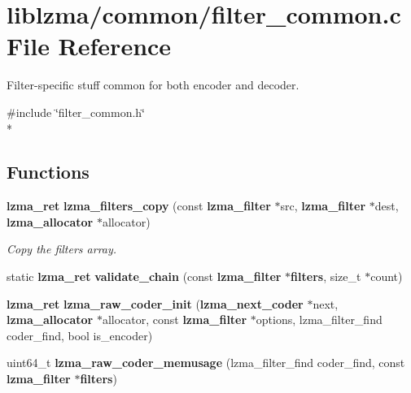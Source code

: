 \section{liblzma/common/filter\-\_\-common.c File Reference}
\label{filter__common_8c}


Filter-\/specific stuff common for both encoder and decoder.  


{\ttfamily \#include \char`\"{}filter\-\_\-common.\-h\char`\"{}}\\*
\subsection*{Functions}
\begin{DoxyCompactItemize}
\item 
{\bf lzma\-\_\-ret} {\bf lzma\-\_\-filters\-\_\-copy} (const {\bf lzma\-\_\-filter} $\ast$src, {\bf lzma\-\_\-filter} $\ast$dest, {\bf lzma\-\_\-allocator} $\ast$allocator)
\begin{DoxyCompactList}\small\item\em Copy the filters array. \end{DoxyCompactList}\item 
static {\bf lzma\-\_\-ret} {\bfseries validate\-\_\-chain} (const {\bf lzma\-\_\-filter} $\ast${\bf filters}, size\-\_\-t $\ast$count)\label{filter__common_8c_a86c7af045ea6eac6133d22c110d43ca2}

\item 
{\bf lzma\-\_\-ret} {\bfseries lzma\-\_\-raw\-\_\-coder\-\_\-init} ({\bf lzma\-\_\-next\-\_\-coder} $\ast$next, {\bf lzma\-\_\-allocator} $\ast$allocator, const {\bf lzma\-\_\-filter} $\ast$options, lzma\-\_\-filter\-\_\-find coder\-\_\-find, bool is\-\_\-encoder)\label{filter__common_8c_a1be9cd8ce7549e35f6ed23a316984214}

\item 
uint64\-\_\-t {\bfseries lzma\-\_\-raw\-\_\-coder\-\_\-memusage} (lzma\-\_\-filter\-\_\-find coder\-\_\-find, const {\bf lzma\-\_\-filter} $\ast${\bf filters})\label{filter__common_8c_a12438a58b047ffe81f8a5496421cc28c}

\end{DoxyCompactItemize}
